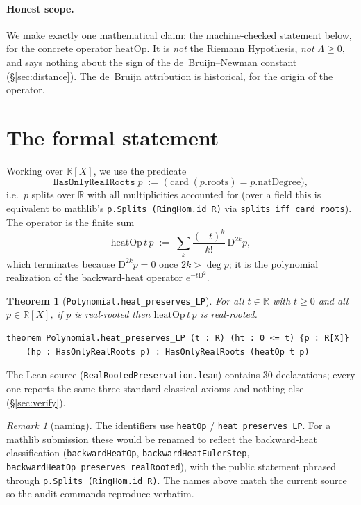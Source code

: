 \documentclass[11pt]{article}
\newtheorem{theorem}{Theorem}
\theoremstyle{definition}
\theoremstyle{remark}
\newtheorem*{remark}{Remark}
\newcommand{\R}{\mathbb{R}}
\newcommand{\heatop}{\mathrm{heatOp}}
\newcommand{\D}{\mathrm{D}}
\begin{document}
\paragraph{Honest scope.}
We make exactly one mathematical claim: the machine-checked statement below, for the concrete
operator $\heatop$. It is \emph{not} the Riemann Hypothesis, \emph{not} $\Lambda \ge 0$, and says
nothing about the sign of the de~Bruijn--Newman constant (\S\ref{sec:distance}). The de~Bruijn
attribution is historical, for the origin of the operator.

\section{The formal statement}\label{sec:statement}

Working over $\R[X]$, we use the predicate
\[
  \texttt{HasOnlyRealRoots}\;p \;:=\; \bigl(\operatorname{card}(p.\mathrm{roots}) = p.\mathrm{natDegree}\bigr),
\]
i.e.\ $p$ splits over $\R$ with all multiplicities accounted for (over a field this is equivalent to
mathlib's \texttt{p.Splits (RingHom.id~R)} via \texttt{splits\_iff\_card\_roots}). The operator is
the finite sum
\[
  \heatop\,t\,p \;:=\; \sum_{k} \frac{(-t)^k}{k!}\,\D^{2k} p,
\]
which terminates because $\D^{2k}p = 0$ once $2k > \deg p$; it is the polynomial realization of the
backward-heat operator $e^{-t\D^2}$.

\begin{theorem}[\texttt{Polynomial.heat\_preserves\_LP}]\label{thm:main}
For all $t \in \R$ with $t \ge 0$ and all $p \in \R[X]$, if $p$ is real-rooted then $\heatop\,t\,p$
is real-rooted.
\end{theorem}

\begin{lstlisting}
theorem Polynomial.heat_preserves_LP (t : R) (ht : 0 <= t) {p : R[X]}
    (hp : HasOnlyRealRoots p) : HasOnlyRealRoots (heatOp t p)
\end{lstlisting}

The Lean source (\texttt{RealRootedPreservation.lean}) contains 30 declarations; every one reports
the same three standard classical axioms and nothing else (\S\ref{sec:verify}).

\begin{remark}[naming]
The identifiers use \texttt{heatOp} / \texttt{heat\_preserves\_LP}. For a mathlib submission these
would be renamed to reflect the backward-heat classification (\texttt{backwardHeatOp},
\texttt{backwardHeatEulerStep}, \texttt{backwardHeatOp\_preserves\_realRooted}), with the public
statement phrased through \texttt{p.Splits (RingHom.id~R)}. The names above match the current source
so the audit commands reproduce verbatim.
\end{remark}
\end{document}
